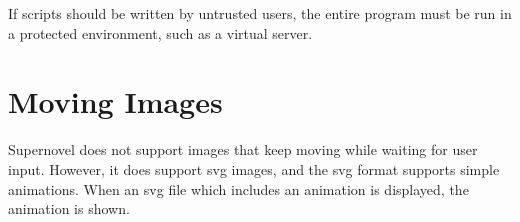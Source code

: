 \documentclass{article}
\begin{document}
If scripts should be written by untrusted users, the entire program must be run
in a protected environment, such as a virtual server.

\section{Moving Images}
Supernovel does not support images that keep moving while waiting for user
input. However, it does support svg images, and the svg format supports simple
animations. When an svg file which includes an animation is displayed, the
animation is shown.
\end{document}
